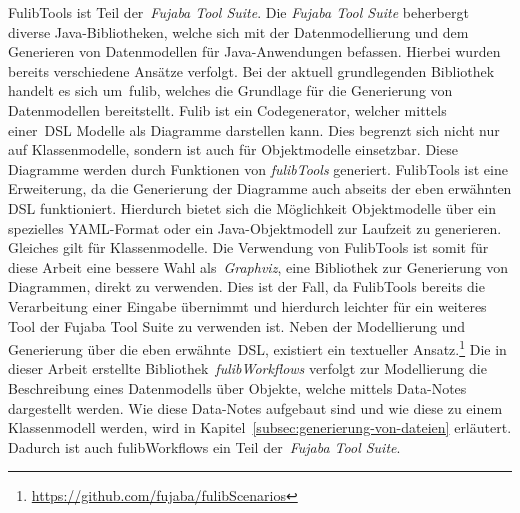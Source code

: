 FulibTools ist Teil der~\textit{Fujaba Tool Suite}.
Die \textit{Fujaba Tool Suite} beherbergt diverse Java-Bibliotheken, welche sich mit der Datenmodellierung
und dem Generieren von Datenmodellen für Java-Anwendungen befassen.
Hierbei wurden bereits verschiedene Ansätze verfolgt.
Bei der aktuell grundlegenden Bibliothek handelt es sich um~\ac{fulib}, welches die Grundlage für die Generierung von
Datenmodellen bereitstellt.
Fulib ist ein Codegenerator, welcher mittels einer~\ac{DSL} Modelle als Diagramme darstellen kann\cite*{fulib}.
Dies begrenzt sich nicht nur auf Klassenmodelle, sondern ist auch für Objektmodelle einsetzbar.
Diese Diagramme werden durch Funktionen von \textit{fulibTools} generiert.
FulibTools ist eine Erweiterung, da die Generierung der Diagramme auch abseits der eben erwähnten DSL funktioniert\cite*{fulibTools}.
Hierdurch bietet sich die Möglichkeit Objektmodelle über ein spezielles YAML-Format oder ein Java-Objektmodell zur Laufzeit zu generieren.
Gleiches gilt für Klassenmodelle.
Die Verwendung von FulibTools ist somit für diese Arbeit eine bessere Wahl als~\textit{Graphviz}, eine Bibliothek zur Generierung von Diagrammen, direkt zu verwenden.
Dies ist der Fall, da FulibTools bereits die Verarbeitung einer Eingabe übernimmt und hierdurch leichter für ein weiteres Tool der Fujaba Tool Suite zu verwenden ist.\newline
Neben der Modellierung und Generierung über die eben erwähnte~\ac{DSL}, existiert ein textueller Ansatz.\footnote{\url{https://github.com/fujaba/fulibScenarios}}
Die in dieser Arbeit erstellte Bibliothek~\textit{fulibWorkflows} verfolgt zur Modellierung die Beschreibung eines Datenmodells über Objekte, welche
mittels Data-Notes dargestellt werden.
Wie diese Data-Notes aufgebaut sind und wie diese zu einem Klassenmodell werden, wird in Kapitel~\ref{subsec:generierung-von-dateien} erläutert.
Dadurch ist auch fulibWorkflows ein Teil der~\textit{Fujaba Tool Suite}.
